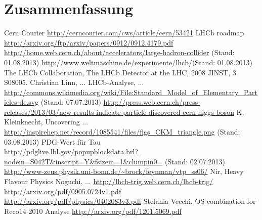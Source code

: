 \documentclass[a4paper]{scrbook}
\begin{document}

\tableofcontents






\chapter{Zusammenfassung}


\begin{thebibliography}{---}
 Cern Courier \url{http://cerncourier.com/cws/article/cern/53421}
 LHCb roadmap \url{http://arxiv.org/ftp/arxiv/papers/0912/0912.4179.pdf}
 \url{http://home.web.cern.ch/about/accelerators/large-hadron-collider} (Stand: 01.08.2013)
 \url{http://www.weltmaschine.de/experimente/lhcb/}(Stand: 01.08.2013)
 The LHCb Collaboration, The LHCb Detector at the LHC, 2008 JINST, 3 S08005.
 Christian Linn, ...
 LHCb-Analyse, ...
 \url{http://commons.wikimedia.org/wiki/File:Standard_Model_of_Elementary_Particles-de.svg} (Stand: 07.07.2013)
 \url{http://press.web.cern.ch/press-releases/2013/03/new-results-indicate-particle-discovered-cern-higgs-boson}
  K. Kleinknecht, Uncovering ...
 \url{http://inspirehep.net/record/1085541/files/figs_CKM_triangle.png} (Stand: 03.08.2013)
 PDG-Wert für Tau \\ \url{http://pdglive.lbl.gov/popupblockdata.brl?nodein=S042T&inscript=Y&fsizein=1&clumpin0=} (Stand: 02.07.2013)
 \url{http://www-zeus.physik.uni-bonn.de/~brock/feynman/vtp_ss06/}
 Nir, Heavy Flavour Physics
 Noguchi, ...
 \url{http://lhcb-trig.web.cern.ch/lhcb-trig/}
 \url{http://arxiv.org/pdf/0905.0724v1.pdf}
 \url{http://arxiv.org/pdf/physics/0402083v3.pdf}
 Stefania Vecchi, OS combination for Reco14
 2010 Analyse
 \url{http://arxiv.org/pdf/1201.5069.pdf}
\end{thebibliography}


\end{document}
